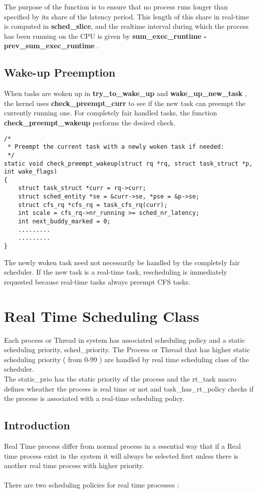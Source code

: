 \documentclass[a4paper]{article}
\begin{document}
 The purpose of the function is to ensure that no process runs longer than specified by its share of
the latency period. This length of this share in real-time is computed in \textbf{sched\_slice}, and the realtime interval during which the process has been running on the CPU is given by \textbf{sum\_exec\_runtime - prev\_sum\_exec\_runtime }.

\subsection{Wake-up Preemption}
When tasks are woken up in \textbf{try\_to\_wake\_up} and \textbf{wake\_up\_new\_task} , the kernel uses
\textbf{check\_preempt\_curr} to see if the new task can preempt the currently running one. For completely fair handled tasks, the function \textbf{check\_preempt\_wakeup} performs the desired check.
\begin{verbatim}
/*
 * Preempt the current task with a newly woken task if needed:
 */
static void check_preempt_wakeup(struct rq *rq, struct task_struct *p, int wake_flags)
{
	struct task_struct *curr = rq->curr;
	struct sched_entity *se = &curr->se, *pse = &p->se;
	struct cfs_rq *cfs_rq = task_cfs_rq(curr);
	int scale = cfs_rq->nr_running >= sched_nr_latency;
	int next_buddy_marked = 0;
    .........
    .........
}
\end{verbatim}

The newly woken task need not necessarily be handled by the completely fair scheduler. If the new task is a real-time task, rescheduling is immediately requested because real-time tasks always preempt CFS tasks.

\section{Real Time Scheduling Class}

\label{sec:real time schdeuling}

Each process or Thread in system has associated scheduling policy and a static scheduling priority, sched\_priority. The Process or Thread that has higher static scheduling priority ( from 0-99  ) are handled by real time scheduling class of the scheduler.\\ 
The static\_prio has the static priority of the process and the rt\_task macro defines wheather the process is real time or not and task\_has\_rt\_policy checks if the process is associated with a real-time scheduling policy.

\subsection{Introduction}
Real Time process differ from normal process in a essential way that if a Real time process exist in the system it will always be selected first unless there is another real time process with higher priority.\\
\\
There are two scheduling policies for real time processes :
\end{document}
